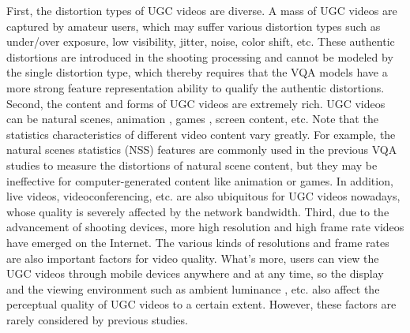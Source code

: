 \documentclass[sigconf]{acmart}
\begin{document}
First, the distortion types of UGC videos are diverse. A mass of UGC videos are captured by amateur users, which may suffer various distortion types such as under/over exposure, low visibility, jitter, noise, color shift, etc. These authentic distortions are introduced in the shooting processing and cannot be modeled by the single distortion type, which thereby requires that the VQA models have a more strong feature representation ability to qualify the authentic distortions.
Second, the content and forms of UGC videos are extremely rich. UGC videos can be natural scenes, animation \cite{wang2022subjective}, games \cite{zadtootaghaj2020quality, zadtootaghaj2018nr}, screen content, etc. Note that the statistics characteristics of different video content vary greatly. For example, the natural scenes statistics (NSS) features \cite{mittal2012making,mittal2012no,saad2014blind,mittal2015completely} are commonly used in the previous VQA studies to measure the distortions of natural scene content, but they may be ineffective for computer-generated content like animation or games. In addition, live videos, videoconferencing, etc. are also ubiquitous for UGC videos nowadays, whose quality is severely affected by the network bandwidth. 
Third, due to the advancement of shooting devices, more high resolution \cite{lu2022deep} and high frame rate \cite{madhusudana2021subjective, zheng2022no, zheng2022faver} videos have emerged on the Internet. The various kinds of resolutions and frame rates are also important factors for video quality. What's more, users can view the UGC videos through mobile devices anywhere and at any time, so the display \cite{rehman2015display} and the viewing environment such as ambient luminance \cite{sun2020dynamic}, etc. also affect the perceptual quality of UGC videos to a certain extent. However, these factors are rarely considered by previous studies.
\end{document}
